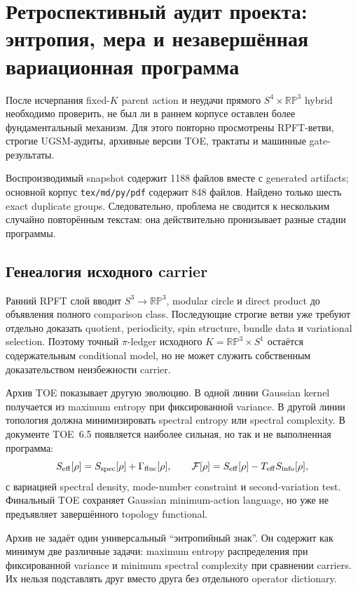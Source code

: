 \chapter{Ретроспективный аудит проекта: энтропия, мера и незавершённая вариационная программа}

После исчерпания fixed-\(K\) parent action и неудачи прямого
\(S^4\times\mathbb{RP}^3\) hybrid необходимо проверить, не был ли в раннем
корпусе оставлен более фундаментальный механизм. Для этого повторно
просмотрены RPFT-ветви, строгие UGSM-аудиты, архивные версии TOE, трактаты и
машинные gate-результаты.

Воспроизводимый snapshot содержит 1188 файлов вместе с generated
artifacts; основной корпус \texttt{tex/md/py/pdf} содержит 848 файлов.
Найдено только шесть exact duplicate groups. Следовательно, проблема не
сводится к нескольким случайно повторённым текстам: она действительно
пронизывает разные стадии программы.

\section{Генеалогия исходного carrier}

Ранний RPFT слой вводит
\(S^3\to\mathbb{RP}^3\), modular circle и direct product до объявления
полного comparison class. Последующие строгие ветви уже требуют отдельно
доказать quotient, periodicity, spin structure, bundle data и
variational selection. Поэтому точный \(\pi\)-ledger исходного
\(K=\mathbb{RP}^3\times S^1\) остаётся содержательным conditional model, но
не может служить собственным доказательством неизбежности carrier.

Архив TOE показывает другую эволюцию. В одной линии Gaussian kernel
получается из maximum entropy при фиксированной variance. В другой линии
топология должна минимизировать spectral entropy или spectral complexity.
В документе TOE~6.5 появляется наиболее сильная, но так и не выполненная
программа:
\begin{equation}
 S_{\rm eff}[\rho]
 =S_{\rm spec}[\rho]+\Gamma_{\rm fluc}[\rho],
 \qquad
 \mathcal F[\rho]
 =S_{\rm eff}[\rho]-T_{\rm eff}S_{\rm info}[\rho],
 \label{eq:archival-toe65-program}
\end{equation}
с вариацией spectral density, mode-number constraint и second-variation
test. Финальный TOE сохраняет Gaussian minimum-action language, но уже не
предъявляет завершённого topology functional.

\begin{proposition}
Архив не задаёт один универсальный ``энтропийный знак''. Он содержит как
минимум две различные задачи: maximum entropy распределения при фиксированной
variance и minimum spectral complexity при сравнении carriers. Их нельзя
подставлять друг вместо друга без отдельного operator dictionary.
\end{proposition}

